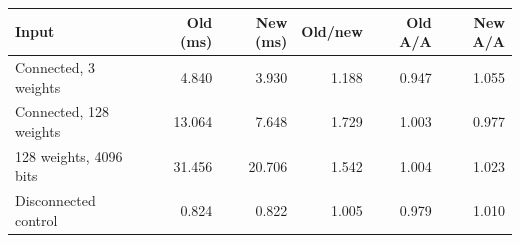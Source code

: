 \begin{tabular}{lrrrrr}
\toprule
Input & Old (ms) & New (ms) & Old/new & Old A/A & New A/A \\
\midrule
Connected, 3 weights & 4.840 & 3.930 & 1.188 & 0.947 & 1.055 \\
Connected, 128 weights & 13.064 & 7.648 & 1.729 & 1.003 & 0.977 \\
128 weights, 4096 bits & 31.456 & 20.706 & 1.542 & 1.004 & 1.023 \\
Disconnected control & 0.824 & 0.822 & 1.005 & 0.979 & 1.010 \\
\bottomrule
\end{tabular}
